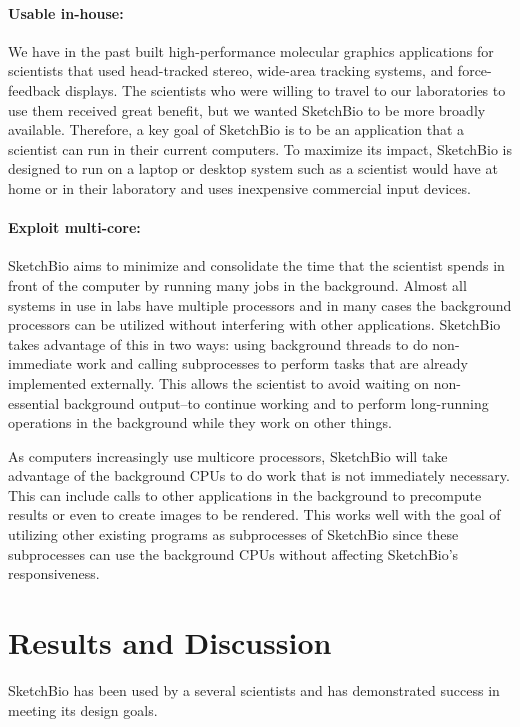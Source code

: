 \documentclass[twocolumn]{bmcart}%
\begin{document}
\paragraph*{Usable in-house:} We have in the past built high-performance molecular graphics applications for scientists that used head-tracked stereo, wide-area tracking systems, and force-feedback displays.  \cite{Arthur}\cite{Grant1998}\cite{Marshburn2005}\cite{Taylor1999}\cite{Taylor1997}\cite{Taylor1993}  The scientists who were willing to travel to our laboratories to use them received great benefit, but we wanted SketchBio to be more broadly available.  Therefore, a key goal of SketchBio is to be an application that a scientist can run in their current computers.  To maximize its impact, SketchBio is designed to run on a laptop or desktop system such as a scientist would have at home or in their laboratory and uses inexpensive commercial input devices.

\paragraph*{Exploit multi-core:} SketchBio aims to minimize and consolidate the time that the scientist spends in front of the computer by running many jobs in the background.  Almost all systems in use in labs have multiple processors and in many cases the background processors can be utilized without interfering with other applications.  SketchBio takes advantage of this in two ways: using background threads to do non-immediate work and calling subprocesses to perform tasks that are already implemented externally.  This allows the scientist to avoid waiting on non-essential background output--to continue working and to perform long-running operations in the background while they work on other things.

As computers increasingly use multicore processors, SketchBio will take advantage of the background CPUs to do work that is not immediately necessary.  This can include calls to other applications in the background to precompute results or even to create images to be rendered.  This works well with the goal of utilizing other existing programs as subprocesses of SketchBio since these subprocesses can use the background CPUs without affecting SketchBio's responsiveness.

\section*{Results and Discussion}
SketchBio has been used by a several scientists and has demonstrated success in meeting its design goals.
\end{document}
